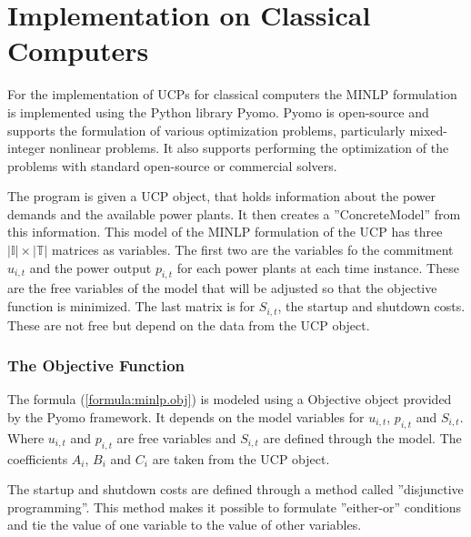 \section{Implementation on Classical Computers}

For the implementation of UCPs for classical computers
the MINLP formulation is implemented using the Python library Pyomo.
Pyomo is open-source and supports the formulation of various optimization problems,
particularly mixed-integer nonlinear problems.
It also supports performing the optimization of the problems
with standard open-source or commercial solvers.
\cite{hart2011pyomo}

The program is given a UCP object, that holds information
about the power demands and the available power plants.
It then creates a ''ConcreteModel'' from this information.
This model of the MINLP formulation of the UCP
has three $| \mathbb{I} | \times | \mathbb{T} |$ matrices as variables.
The first two are the variables fo the commitment $u_{i, t}$
and the power output $p_{i, t}$ for each power plants at each time instance.
These are the free variables of the model that will be adjusted so that the objective function is minimized.
The last matrix is for $S_{i, t}$, the startup and shutdown costs.
These are not free but depend on the data from the UCP object.


\subsubsection{The Objective Function}

The formula (\ref{formula:minlp.obj}) is modeled using a Objective object provided by the Pyomo framework.
It depends on the model variables for $u_{i, t}$, $p_{i, t}$ and $S_{i, t}$.
Where $u_{i, t}$ and $p_{i, t}$ are free variables and $S_{i, t}$ are defined through the model.
The coefficients $A_i$, $B_i$ and $C_i$ are taken from the UCP object.


The startup and shutdown costs are defined through a method called ''disjunctive programming''.
This method makes it possible to formulate ''either-or'' conditions
and tie the value of one variable to the value of other variables.
\cite{Balas1983}

